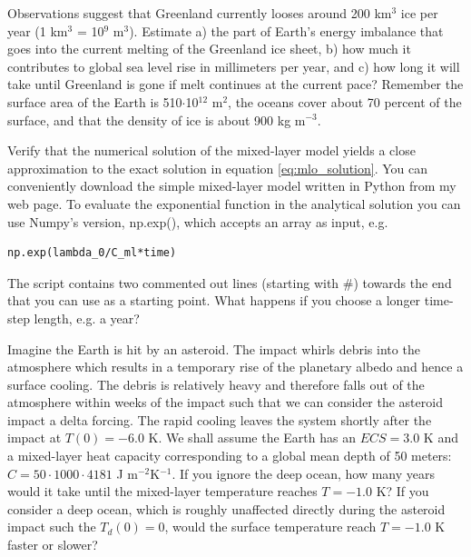 \documentclass[12pt]{book}
\begin{document}


\newpage
\vspace{1 cm}
{\setlength{\parindent}{0cm}
\begin{exercise}
Observations suggest that Greenland currently looses around 200 km$^3$ ice per year (1 km$^3$ = 10$^9$ m$^3$). Estimate a) the part of Earth's energy imbalance that goes into the current melting of the Greenland ice sheet, b) how much it contributes to global sea level rise in millimeters per year, and c) how long it will take until Greenland is gone if melt continues at the current pace? Remember the surface area of the Earth is 510$\cdot$10$^{12}$ m$^2$, the oceans cover about 70 percent of the surface, and that the density of ice is about 900 kg m$^{-3}$. 
\end{exercise}

\begin{exercise}
Verify that the numerical solution of the mixed-layer model yields a close approximation to the exact solution in equation \ref{eq:mlo_solution}. You can conveniently download the simple mixed-layer model written in Python from my web page. To evaluate the exponential function in the analytical solution you can use Numpy's version, np.exp(), which accepts an array as input, e.g.
\begin{verbatim}
np.exp(lambda_0/C_ml*time)
\end{verbatim}
The script contains two commented out lines (starting with \#) towards the end that you can use as a starting point. What happens if you choose a longer time-step length, e.g. a year?
\end{exercise}

\begin{exercise}
Imagine the Earth is hit by an asteroid. The impact whirls debris into the atmosphere which results in a temporary rise of the planetary albedo and hence a surface cooling. The debris is relatively heavy and therefore falls out of the atmosphere within weeks of the impact such that we can consider the asteroid impact a delta forcing. The rapid cooling leaves the system shortly after the impact at $T(0)=-6.0$ K. We shall assume the Earth has an $ECS=3.0$ K and a mixed-layer heat capacity  corresponding to a global mean depth of 50 meters: $C= 50\cdot 1000 \cdot 4181$ J m$^{-2}$K$^{-1}$. 
If you ignore the deep ocean, how many years would it take until the mixed-layer temperature reaches $T=-1.0$ K?
If you consider a deep ocean, which is roughly unaffected directly during the asteroid impact such the $T_d(0)=0$, would the surface temperature reach $T=-1.0$ K faster or slower?
\end{exercise}

}
\end{document}
